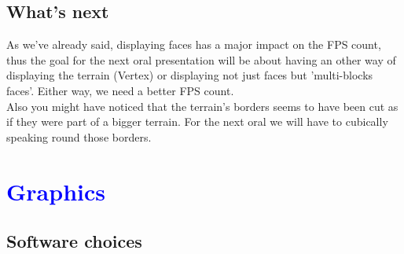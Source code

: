 \documentclass[article]{report} %
\begin{document}
			\section{What's next}
				As we've already said, displaying faces has a major impact on the FPS count, thus the goal for the next oral presentation will be about having an other way of displaying the terrain (Vertex) or displaying not just faces but 'multi-blocks faces'. Either way, we need a better FPS count. \\

			Also you might have noticed that the terrain's borders seems to have been cut as if they were part of a bigger terrain. For the next oral we will have to cubically speaking round those borders. 

		\chapter{\textcolor{blue}{Graphics}}
			\section{Software choices}
\end{document}
